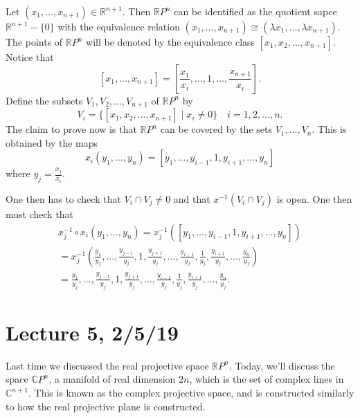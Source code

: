 \documentclass[12pt,letterpaper,boxed]{maths_v5}
\newcommand{\rr}{\mathbb{R}}
\newcommand{\cc}{\mathbb{C}}
\theoremstyle{definition}
\begin{document}
    Let $(x_1, \dots, x_{n+1})\in \rr^{n+1}$. Then $\rr P^n$ can be identified as the quotient sapce $\rr^{n+1}- \{0\}$
    with the equivalence relation $(x_1, \dots, x_{n+1}) \cong (\lambda x_1, \dots, \lambda x_{n+1})$. 
    The points of $\rr P^n$ will be denoted by the equivalence class $[x_1, x_2, \dots, x_{n+1}]$. 
    Notice that 
    \[
      [x_1, \dots, x_{n+1}] = [\frac{x_1}{x_i}, \dots, 1, \dots, \frac{x_{n+1}}{x_i}].
    \]
    Define the subsets $V_1, V_2, \dots, V_{n+1}$ of $\rr P^n$ by 
    \[
        V_i = \{[x_1, x_2, \dots, x_{n+1}] \mid x_i \ne 0 \} \quad i = 1,2, \dots, n.
    \]
    The claim to prove now is that $\rr P^n$ can be covered by the sets $V_1, \dots, V_n$. 
    This is obtained by the maps 
    \[
        x_i(y_1,  \dots, y_n) = [y_1, \dots, y_{i-1}, 1, y_{i+1}, \dots, y_n] 
    \]
    where $y_{j} = \frac{x_j}{x_i}$. 

    One then has to check that $V_i \cap V_j \ne 0$ and that $x^{-1}(V_i \cap V_j)$ is open.
    One then must check that  
    \begin{align*}
        x_j^{-1}\circ x_i(y_1, \dots, y_n)= x_j^{-1}([y_1, \dots, y_{i-1}, 1, y_{i+1},  \dots, y_n])\\
        = x_j^{-1}(\frac{y_1}{y_j}, \dots, \frac{y_{j-1}}{y_j}, 1, \frac{y_{j+1}}{y_j}, \dots, \frac{y_{i-1}}{y_j}, \frac{1}{y_j}, \frac{y_{i+1}}{y_j}, \dots, \frac{y_n}{y_j} )\\
        = \frac{y_1}{y_j}, \dots, \frac{y_{j-1}}{y_j}, 1, \frac{y_{j+1}}{y_j}, \dots, \frac{y_{i-1}}{y_j}, \frac{1}{y_j}, \frac{y_{i+1}}{y_j}, \dots, \frac{y_n}{y_j}.
    \end{align*}

    \section*{Lecture 5, 2/5/19}
    Last time we discussed the real projective space $\rr P^n$. Today, we'll discuss 
    the space $\cc P^{n}$, a manifold of real dimension $2n$, which is the set of complex lines in $\cc^{n+1}$. This 
    is known as the complex projective space, and is constructed similarly to how the real 
    projective plane is constructed. 
\end{document}
